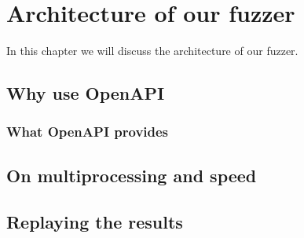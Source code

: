 \chapter{Architecture of our fuzzer}
In this chapter we will discuss the architecture of our fuzzer.

\section{Why use OpenAPI}
\subsection{What OpenAPI provides}

\section{On multiprocessing and speed}

\section{Replaying the results}
